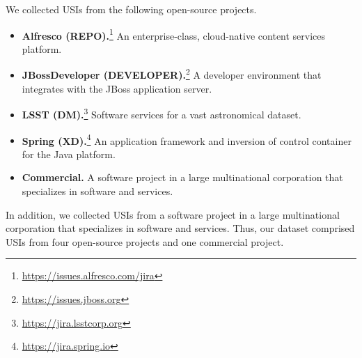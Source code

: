 We collected USIs from the following open-source projects. 
\begin{itemize}
	\item \textbf{Alfresco (REPO).}\footnote{\url{https://issues.alfresco.com/jira}} 
	An enterprise-class, cloud-native content services platform. 
	\item \textbf{JBossDeveloper (DEVELOPER).}\footnote{\url{https://issues.jboss.org}} 
	A developer environment that integrates with the JBoss application server.
	\item \textbf{LSST (DM).}\footnote{\url{https://jira.lsstcorp.org}} Software services 
	for a vast astronomical dataset.
	\item \textbf{Spring (XD).}\footnote{\url{https://jira.spring.io}} 
	An application framework and inversion of control container for the Java platform.
	\item \textbf{Commercial.} A software project in a large multinational corporation that specializes in software and services.
\end{itemize}
In addition, we collected USIs from a software project in a large multinational corporation that specializes in software and services.
Thus, our dataset comprised USIs from four open-source projects and one commercial project. 





